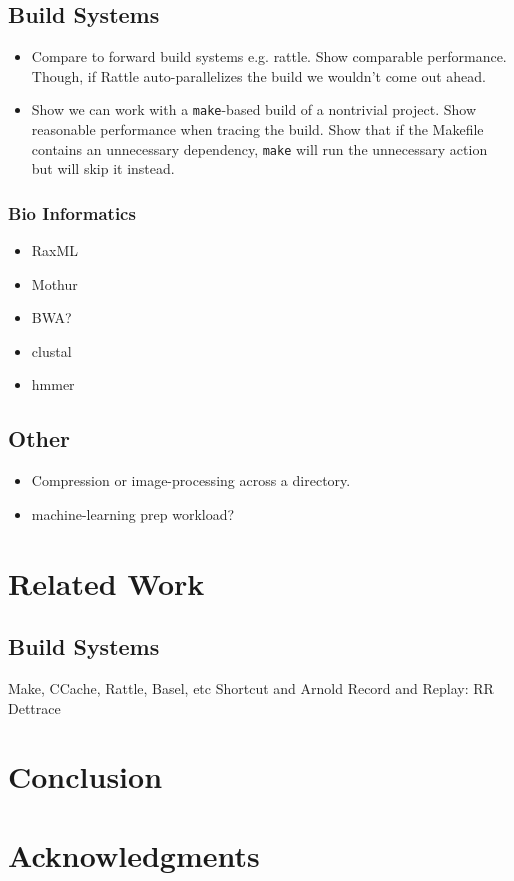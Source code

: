 \subsection{Build Systems}

\begin{itemize}
\item Compare to forward build systems e.g. rattle. Show comparable performance. Though, if Rattle auto-parallelizes the build we wouldn't come out ahead.
\item Show we can work with a \texttt{make}-based build of a nontrivial project. Show reasonable performance when tracing the build. Show that if the Makefile contains an unnecessary dependency, \texttt{make} will run the unnecessary action but \pc will skip it instead.
\end{itemize}

\subsubsection{Bio Informatics}
\begin{itemize}
  \item RaxML \cacheunit
  \item Mothur
  \item BWA?
  \item clustal
  \item hmmer
\end{itemize}

\subsection{Other}

\begin{itemize}
    \item Compression or image-processing across a directory.
    \item machine-learning prep workload?
\end{itemize}

\section{Related Work}
\subsection{Build Systems}
Make, CCache, Rattle, Basel, etc
Shortcut and Arnold
Record and Replay: RR
Dettrace

\section{Conclusion}
\section{Acknowledgments}
